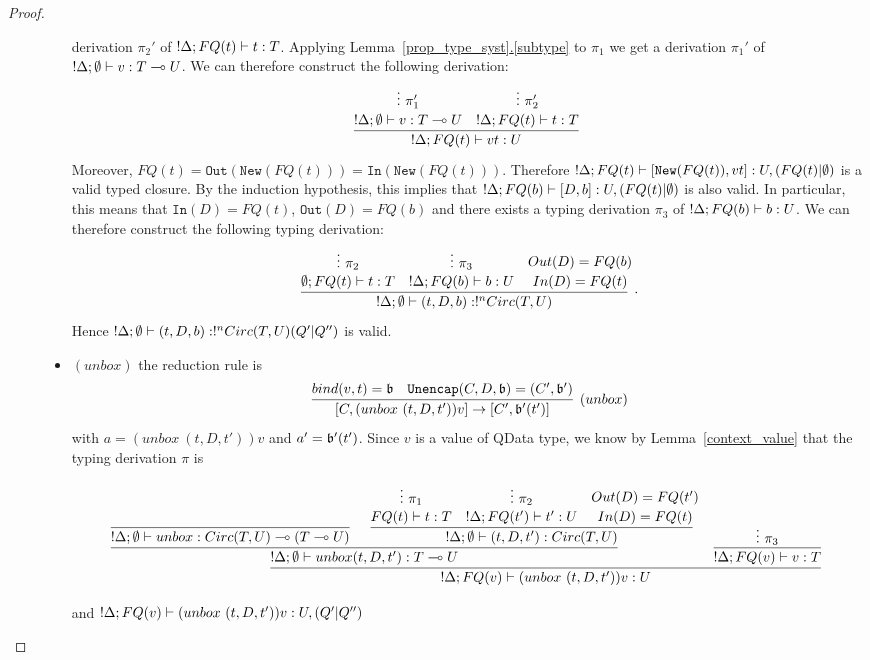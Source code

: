 \documentclass{article}
\begin{document}
\begin{proof}
\begin{description}
\begin{itemize}
  derivation $\pi_2'$ of $!\Delta;FQ(t)\vdash t:T$. 
  Applying Lemma~\hyperref[subtype]{\ref*{prop_type_syst}.\ref*{subtype}}
  to $\pi_1$ we get a derivation $\pi_1'$ of $!\Delta ;\emptyset\vdash v:T\multimap U$.
  We can therefore construct the following derivation:
  \[
  \infer[]{!\Delta;FQ(t)\entails vt : U}{
    \deduce[]{!\Delta ;\emptyset\entails v:T\loli U}{
      \vdots ~\pi_1'
    }
    &
    \deduce[]{!\Delta;FQ(t)\entails t:T}{
      \vdots ~\pi_2'
    }
  }
  \]
  Moreover, $FQ(t)=\mathtt{Out}(\mathtt{New}(FQ(t)))=\mathtt{In}(\mathtt{New}(FQ(t)))$. 
  Therefore $!\Delta;FQ(t)\vdash [\mathtt{New}(FQ(t)),vt]:U,(FQ(t)|\emptyset)$ is a 
  valid typed closure. By the induction hypothesis, this implies that 
  $!\Delta;FQ(b)\vdash [D,b]:U,(FQ(t)|\emptyset)$ is also valid.
  In particular, this means that $\mathtt{In}(D)=FQ(t)$, $\mathtt{Out}(D)=FQ(b)$ 
  and there exists a typing derivation $\pi_3$ of $!\Delta;FQ(b)\vdash b:U$.
  We can therefore construct the following typing derivation:
  \[
  \infer[.]{!\Delta;\emptyset \entails (t,D,b):!^nCirc(T,U)}{
    \deduce[]{\emptyset ; FQ(t)\entails t:T}{
      \vdots~\pi_2
    }
    &
    \deduce[]{!\Delta ; FQ(b)\entails b:U}{
      \vdots~\pi_3
    } 
    &
    \deduce[]{In(D)=FQ(t) }{
      Out(D)=FQ(b)
    }
  }
  \]  
  Hence $!\Delta ;\emptyset \vdash (t,D,b):!^nCirc(T,U) (Q'|Q'')$ is valid.
  \item $(unbox)$ the reduction rule is
  \[
    \infer[(unbox)]{[C,(unbox~(t,D,t'))v]\to [C',\binding'(t')]}{
      bind(v,t)=\binding 
      &
      \mathtt{Unencap}(C,D,\binding) = (C',\binding') 
    }
  \]
  with $a=(unbox~(t,D,t'))v$ and $a'=\mathfrak{b}'(t')$. Since $v$ is a value of 
  QData type, we know by 
  Lemma~\hyperref[context_value]{\ref*{context_value}}
  that the typing derivation $\pi$ is 
  \begin{changemargin}{-4.8cm}{-1cm}
  \[
  \infer[]{!\Delta; FQ(v)\entails (unbox~(t,D,t'))v :U}{
    \infer[]{!\Delta;\emptyset\entails unbox(t,D,t'):T\loli U}{
      \infer[]{!\Delta;\emptyset \entails unbox:Circ(T,U)\loli (T\loli U)}{
      }   
      &
      \infer[]{!\Delta ;\emptyset\entails (t,D,t'):Circ(T,U)}{
        \deduce[]{FQ(t)\entails t:T}{
          \vdots ~\pi_1
        }
        &
        \deduce[]{!\Delta;FQ(t')\entails t':U}{
          \vdots ~\pi_2     
        }
        &
        \deduce[]{In(D)=FQ(t)}{
          Out(D)=FQ(t')
        }
      }
    }
    &
    \infer[]{!\Delta ; FQ(v)\entails v:T}{
      \vdots~\pi_3
    }
  }
  \]
  \end{changemargin}
  and $!\Delta; FQ(v)\vdash (unbox~(t,D,t'))v :U,(Q'|Q'')$ 

\end{itemize}
\end{description}
\end{proof}
\end{document}
